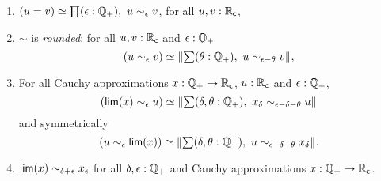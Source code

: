 \begin{lem}\label{RC-sim-uniformity-properties}
  \mbox{}
  \begin{enumerate}

  \item \label{RC-sim-diagonal}
    $\eqv{(u = v)}{\prd{\epsilon : \Qp} u \sim_\epsilon v}$, for all $u, v : \mathbb{R}_\mathsf{c}$,

  \item \label{RC-sim-rounded}
    $\sim$ is \emph{rounded}:
    for all $u, v : \mathbb{R}_\mathsf{c}$ and $\epsilon : \mathbb{Q}_{+}$
    \begin{equation*}
      \eqv{
        (u \sim_\epsilon v)
      }{
        \brck{\sm{\theta : \Qp} u \sim_{\epsilon - \theta} v}
      },
    \end{equation*}


  \item \label{RC-sim-lim-rounded}
    For all Cauchy approximations $x : \mathbb{Q}_{+} \to \mathbb{R}_\mathsf{c}$, $u : \mathbb{R}_\mathsf{c}$ and $\epsilon : \mathbb{Q}_{+}$,
    \begin{equation*}
      \eqv{
        (\rclim(x) \sim_\epsilon u)
      }{
        \brck{\sm{\delta, \theta : \Qp} x_\delta \sim_{\epsilon - \delta - \theta} u}
      }
    \end{equation*}
    and symmetrically
    \begin{equation*}
      \eqv{
        (u \sim_\epsilon \rclim(x))
      }{
        \brck{\sm{\delta, \theta : \Qp} u \sim_{\epsilon - \delta - \theta} x_\delta}
      }.
    \end{equation*}
    
  \item \label{RC-sim-self}
    $\mathsf{lim}(x) \sim_{\delta + \epsilon} x_\epsilon$ for all $\delta, \epsilon : \mathbb{Q}_{+}$
    and Cauchy approximations $x : \mathbb{Q}_{+} \to \mathbb{R}_\mathsf{c}$.

  \end{enumerate}
\end{lem}

